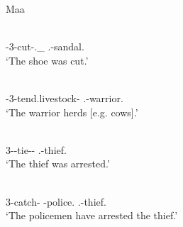 \begin{exe}\ex\label{MaaPass} {Maa} \citep[ex.11, ex.13, ex.16, ex.15]{Payne:2007}\nopagebreak[4]
\begin{xlist}
\ex\gll{} \\
\con{}-3-cut-\Mid{}.\Non\_\pfv{} \fem{}.\sg{}-sandal.\nom{}\\
`The shoe was cut.'

\ex\gll{} \\
\con{}-3-tend.livestock-\antip{} \mas{}.\sg{}-warrior.\nom{}\\
`The warrior herds [e.g. cows].'

\ex\gll{} \\
3-\pfv{}-tie-\pfv{}-\pass{} \mas{}.\sg{}-thief.\acc{}\\
`The thief was arrested.'

\ex\gll{} 	\\
3-catch-\pfv{} \pl{}-police.\nom{} \mas{}.\sg{}-thief.\acc{}\\
`The policemen have arrested the thief.'
\end{xlist}
\end{exe}





